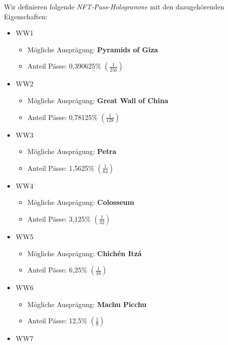 \begin{NFT-Prop}

Wir definieren folgende \textit{NFT-Pass-Hologramme} mit den dazugehörenden Eigenschaften:

\begin{itemize}
    \item WW1
    \begin{itemize}
    	\item Mögliche Ausprägung: \textbf{Pyramids of Giza}
    	\item Anteil Pässe: 0,390625\% $\left( \frac{1}{256} \right)$
    \end{itemize}
    \item WW2
    \begin{itemize}
    	\item Mögliche Ausprägung: \textbf{Great Wall of China}
    	\item Anteil Pässe: 0,78125\% $\left( \frac{1}{128} \right)$
    \end{itemize}
    \item WW3
    \begin{itemize}
    	\item Mögliche Ausprägung: \textbf{Petra} 
    	\item Anteil Pässe: 1,5625\% $\left( \frac{1}{64} \right)$
    \end{itemize}
    \item WW4
    \begin{itemize}
    	\item Mögliche Ausprägung: \textbf{Colosseum} 
    	\item Anteil Pässe: 3,125\% $\left( \frac{1}{32} \right)$
    \end{itemize}
    \item WW5
    \begin{itemize}
    	\item Mögliche Ausprägung: \textbf{Chichén Itzá} 
    	\item Anteil Pässe: 6,25\% $\left( \frac{1}{16} \right)$
    \end{itemize}
    \item WW6
    \begin{itemize}
    	\item Mögliche Ausprägung: \textbf{Machu Picchu} 
    	\item Anteil Pässe: 12,5\% $\left( \frac{1}{8} \right)$
    \end{itemize}
    \item WW7
    \begin{itemize}

\end{itemize}
\end{itemize}
\end{NFT-Prop}
